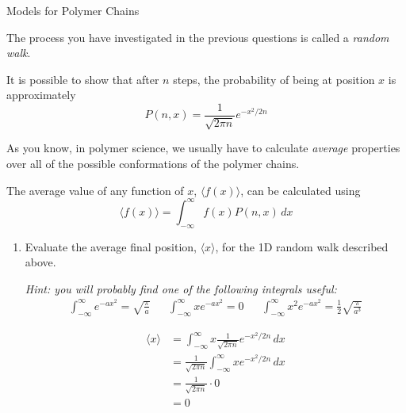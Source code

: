 \begin{activity}{Models for Polymer Chains}
\begin{ctqs}
\end{ctqs}

\begin{infobox}
	
	The process you have investigated in the previous questions is called a \emph{random walk}.
	
	It is possible to show that after $n$ steps, the probability of being at position $x$ is approximately
	\begin{equation*}
		P(n,x) = \frac{1}{\sqrt{2\pi n}}e^{-x^2/2n}
	\end{equation*}
	
\end{infobox}

\begin{ctqs}

	\question As you know, in polymer science, we usually have to calculate \emph{average} properties over all of the possible conformations of the polymer chains.
	
		The average value of any function of $x$, $\langle f(x)\rangle$, can be calculated using
		\begin{equation*}
			\langle f(x) \rangle = \int_{-\infty}^\infty f(x) P(n,x)\,dx
		\end{equation*}
		
		\begin{enumerate}
			\item Evaluate the average final position, $\langle x \rangle$, for the 1D random walk described above.
			
				\emph{Hint: you will probably find one of the following integrals useful:}
				\begin{align*}
					\int_{-\infty}^\infty e^{-a x^2} = \sqrt{\frac{\pi}{a}} && \int_{-\infty}^\infty x e^{-a x^2} = 0 && \int_{-\infty}^\infty x^2 e^{-a x^2} = \frac{1}{2}\sqrt{\frac{\pi}{a^3}}
				\end{align*}
				
				\begin{solution}[1.5in]
					\begin{align*}
						\langle x \rangle &= \int_{-\infty}^\infty x \frac{1}{\sqrt{2\pi n}}e^{-x^2/2n}\, dx\\
						&= \frac{1}{\sqrt{2\pi n}} \int_{-\infty}^\infty x e^{-x^2/2n}\, dx\\
						&= \frac{1}{\sqrt{2\pi n}} \cdot 0\\
						&= 0
					\end{align*}
				\end{solution}
				

\end{enumerate}
\end{ctqs}
\end{activity}
